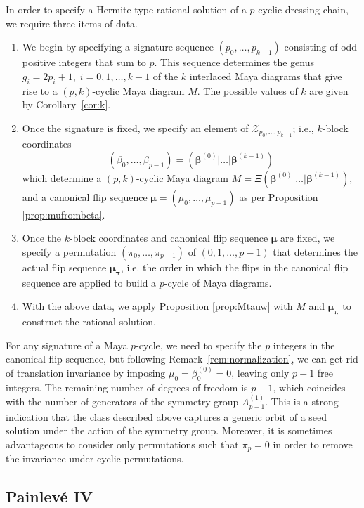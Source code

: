 \documentclass{amsart}
\theoremstyle{definition}
\newcommand{\bbeta}{{\boldsymbol{\beta}}}
\newcommand{\bmu}{{\boldsymbol{\mu}}}
\newcommand{\bpi}{{\boldsymbol{\pi}}}
\newcommand{\cZ}{\mathcal{Z}}
\begin{document}
In order to specify a Hermite-type rational solution of a $p$-cyclic
dressing chain, we require three items of data.
\begin{enumerate}
\item We begin by specifying a signature sequence
  $(p_0,\ldots, p_{k-1})$ consisting of odd positive integers that sum
  to $p$. This sequence determines the genus
  $g_i = 2p_i+1,\; i=0,1,\ldots, k-1$ of the $k$ interlaced Maya
  diagrams that give rise to a $(p,k)$-cyclic Maya diagram $M$. The
  possible values of $k$ are given by Corollary~\ref{cor:k}.
\item Once the signature is fixed, we specify an element of
  $\cZ_{p_0,\ldots, p_{k-1}}$; i.e., $k$-block coordinates
  \[(\beta_0,\dots,\beta_{p-1})=(\bbeta^{(0)}|\ldots|
    \bbeta^{(k-1)})\] which determine a $(p,k)$-cyclic Maya diagram
  $M=\Xi(\bbeta^{(0)}|\ldots| \bbeta^{(k-1)})$, and a canonical flip
  sequence $\bmu=(\mu_0,\dots,\mu_{p-1})$ as per Proposition
  \ref{prop:mufrombeta}.
\item Once the $k$-block coordinates and canonical flip sequence
  $\bmu$ are fixed, we specify a permutation
  $(\pi_0,\ldots, \pi_{p-1})$ of $(0,1,\ldots, p-1)$ that determines
  the actual flip sequence $\bmu_\bpi$, i.e. the order in which the
  flips in the canonical flip sequence are applied to build a
  $p$-cycle of Maya diagrams.
\item With the above data, we apply Proposition \ref{prop:Mtauw} with
  $M$ and $\bmu_\bpi$ to construct the rational solution.
\end{enumerate}

For any signature of a Maya $p$-cycle, we need to specify the $p$
integers in the canonical flip sequence, but following
Remark~\ref{rem:normalization}, we can get rid of translation
invariance by imposing $\mu_0=\beta^{(0)}_0=0$, leaving only $p-1$
free integers.  The remaining number of degrees of freedom is $p-1$,
which coincides with the number of generators of the symmetry group
$A^{(1)}_{p-1}$. This is a strong indication that the class described
above captures a generic orbit of a seed solution under the action of
the symmetry group.  Moreover, it is sometimes advantageous to consider
only permutations such that $\pi_p=0$ in order to remove the
invariance under cyclic permutations.

\subsection{Painlev\'e IV}
\end{document}
